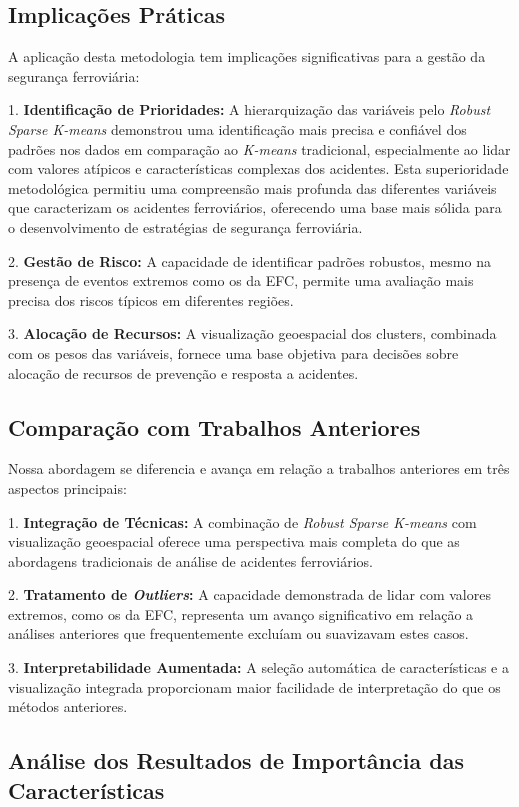 \documentclass[conference]{IEEEtran}
\begin{document}
\subsection{Implicações Práticas}
A aplicação desta metodologia tem implicações significativas para a gestão da segurança ferroviária:

1. \textbf{Identificação de Prioridades:} A hierarquização das variáveis pelo \textit{Robust Sparse K-means} demonstrou uma identificação mais precisa e confiável dos padrões nos dados em comparação ao \textit{K-means} tradicional, especialmente ao lidar com valores atípicos e características complexas dos acidentes. Esta superioridade metodológica permitiu uma compreensão mais profunda das diferentes variáveis que caracterizam os acidentes ferroviários, oferecendo uma base mais sólida para o desenvolvimento de estratégias de segurança ferroviária.

2. \textbf{Gestão de Risco:} A capacidade de identificar padrões robustos, mesmo na presença de eventos extremos como os da EFC, permite uma avaliação mais precisa dos riscos típicos em diferentes regiões.

3. \textbf{Alocação de Recursos:} A visualização geoespacial dos clusters, combinada com os pesos das variáveis, fornece uma base objetiva para decisões sobre alocação de recursos de prevenção e resposta a acidentes.

\subsection{Comparação com Trabalhos Anteriores}
Nossa abordagem se diferencia e avança em relação a trabalhos anteriores em três aspectos principais:

1. \textbf{Integração de Técnicas:} A combinação de \textit{Robust Sparse K-means} com visualização geoespacial oferece uma perspectiva mais completa do que as abordagens tradicionais de análise de acidentes ferroviários.

2. \textbf{Tratamento de \textit{Outliers}:} A capacidade demonstrada de lidar com valores extremos, como os da EFC, representa um avanço significativo em relação a análises anteriores que frequentemente excluíam ou suavizavam estes casos.

3. \textbf{Interpretabilidade Aumentada:} A seleção automática de características e a visualização integrada proporcionam maior facilidade de interpretação do que os métodos anteriores.

\subsection{Análise dos Resultados de Importância das Características}
\end{document}

